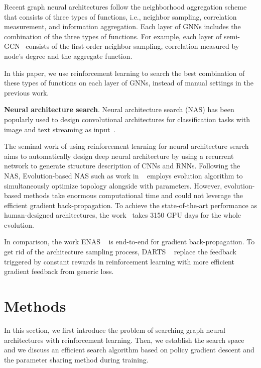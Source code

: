 \documentclass{article}
\begin{document}
Recent graph neural architectures follow the neighborhood aggregation scheme that consists of three types of functions, i.e., neighbor sampling, correlation measurement, and information aggregation. Each layer of GNNs includes the combination of the three types of functions. For example, each layer of semi-GCN~\cite{kipf2017semi} consists of the first-order neighbor sampling, correlation measured by node's degree and the aggregate function. 

In this paper, we use reinforcement learning to search the best combination of these types of functions on each layer of GNNs, instead of manual settings in the previous work. 



\noindent\textbf{Neural architecture search}.
Neural architecture search (NAS) has been popularly used to design convolutional architectures for classification tasks with image and text streaming as input~\cite{NAS,ENAS,Xie2018SNASSN,Zoph2018LearningTA,Bello2017NeuralOS}.

The seminal work of using reinforcement learning for neural architecture search aims to automatically design deep neural architecture by using a recurrent network to generate structure description of CNNs and RNNs. Following the NAS, Evolution-based NAS such as work in ~\cite{Real2017LargeScaleEO,Real2018RegularizedEF} employs evolution algorithm to simultaneously optimize topology alongside with parameters. However, evolution-based methods take enormous computational time and could not leverage the efficient gradient back-propagation. To achieve the state-of-the-art performance as human-designed architectures, the work~\cite{Real2018RegularizedEF} takes 3150 GPU days for the whole evolution. 

In comparison, the work ENAS ~\cite{ENAS} is end-to-end for gradient back-propagation.  To get rid of the architecture sampling process, DARTS ~\cite{Liu2018DARTSDA} replace the feedback triggered by constant rewards in reinforcement learning with more efficient gradient feedback from generic loss.



\section{Methods}
In this section, we first introduce the problem of searching graph neural architectures with reinforcement learning. Then, we establish the search space and we discuss an efficient search algorithm based on policy gradient descent and the parameter sharing method during training. 
\end{document}

